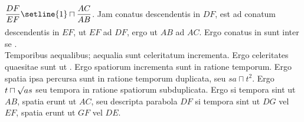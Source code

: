     \pend
    \vspace{1em}
\pstart
$\displaystyle \rule[-4mm]{0mm}{10mm} \frac{DF}{EF} \setline{1}\sqcap \frac{AC}{AB}$.
Jam conatus descendentis in $\displaystyle DF$, est ad conatum descendentis in $\displaystyle EF$,
ut $\displaystyle EF$ ad $\displaystyle DF$, ergo ut $\displaystyle AB$ ad $\displaystyle AC$.
Ergo conatus in 
sunt inter se .\\
\hspace*{7.5mm}
 Temporibus aequalibus; aequalia sunt celeritatum incrementa\protect{}.
Ergo celeritates quaesitae sunt ut
.
Ergo spatiorum incrementa sunt in ratione temporum.
Ergo spatia ipsa percursa\protect{} sunt in ratione temporum duplicata,
seu $\displaystyle sa \sqcap t^2$.
Ergo $\displaystyle t \sqcap \sqrt{\vphantom{as}}as$
seu tempora in ratione spatiorum subduplicata.
Ergo si tempora sint ut $\displaystyle AB$,
spatia erunt ut $\displaystyle AC$,
seu descripta parabola $\displaystyle DF$
si tempora sint ut $\displaystyle DG$ vel $\displaystyle EF$,
spatia erunt ut $\displaystyle GF$ vel $\displaystyle DE$.
\pend
